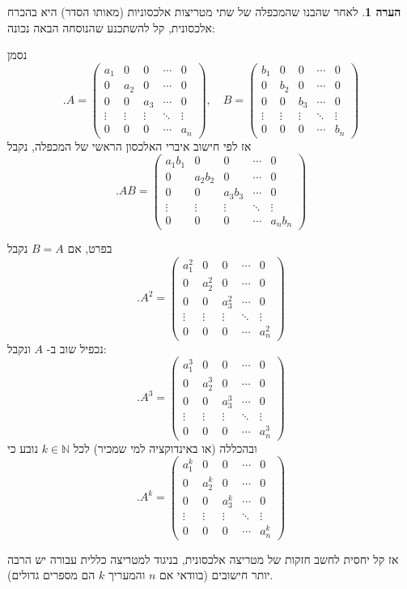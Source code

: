 \documentclass[12pt]{report}
\theoremstyle{plain}
\theoremstyle{definition}
\newtheorem{remark}{הערה}[chapter]
\newcommand{\N}{\mathbb{N}}
\newcommand{\0}{\mathbf{0}}
\begin{document}
\begin{remark}
לאחר שהבנו שהמכפלה של שתי מטריצות אלכסוניות (מאותו הסדר) היא בהכרח אלכסונית, קל להשתכנע שהנוסחה הבאה נכונה:

נסמן
$$
.A=\begin{pmatrix}
a_1 &0 &0 &\cdots &0 \\
0 &a_2 &0 &\cdots &0 \\
0 &0 &a_3 &\cdots &0 \\
\vdots &\vdots &\vdots &\ddots &\vdots \\
0 &0 &0 &\cdots &a_n
\end{pmatrix}, \quad
B=\begin{pmatrix}
b_1 &0 &0 &\cdots &0 \\
0 &b_2 &0 &\cdots &0 \\
0 &0 &b_3 &\cdots &0 \\
\vdots &\vdots &\vdots &\ddots &\vdots \\
0 &0 &0 &\cdots &b_n
\end{pmatrix}
$$
אז לפי חישוב איברי האלכסון הראשי של המכפלה, נקבל
$$
.AB=\begin{pmatrix}
a_1b_1 &0 &0 &\cdots &0 \\
0 &a_2b_2 &0 &\cdots &0 \\
0 &0 &a_3b_3 &\cdots &0 \\
\vdots &\vdots &\vdots &\ddots &\vdots \\
0 &0 &0 &\cdots &a_nb_n
\end{pmatrix}
$$

בפרט, אם
$B=A$
נקבל
$$
.A^2=\begin{pmatrix}
a_1^2 &0 &0 &\cdots &0 \\
0 &a_2^2 &0 &\cdots &0 \\
0 &0 &a_3^2 &\cdots &0 \\
\vdots &\vdots &\vdots &\ddots &\vdots \\
0 &0 &0 &\cdots &a_n^2
\end{pmatrix}
$$
נכפיל שוב ב-
$A$
ונקבל:
$$
.A^3=\begin{pmatrix}
a_1^3 &0 &0 &\cdots &0 \\
0 &a_2^3 &0 &\cdots &0 \\
0 &0 &a_3^3 &\cdots &0 \\
\vdots &\vdots &\vdots &\ddots &\vdots \\
0 &0 &0 &\cdots &a_n^3
\end{pmatrix}
$$
ובהכללה (או באינדוקציה למי שמכיר) לכל
$k\in\N$
נובע כי
$$
.A^k=\begin{pmatrix}
a_1^k &0 &0 &\cdots &0 \\
0 &a_2^k &0 &\cdots &0 \\
0 &0 &a_3^k &\cdots &0 \\
\vdots &\vdots &\vdots &\ddots &\vdots \\
0 &0 &0 &\cdots &a_n^k
\end{pmatrix}
$$

אז קל יחסית לחשב חזקות של מטריצה אלכסונית, בניגוד למטריצה כללית עבורה יש הרבה יותר חישובים (בוודאי אם 
$n$
והמעריך
$k$
הם מספרים גדולים). 

\end{remark}
\end{document}
